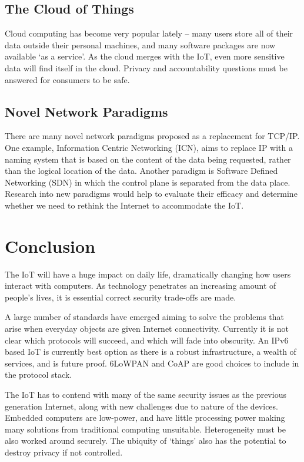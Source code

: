 \documentclass[10pt,journal,compsoc]{IEEEtran}
\begin{document}
\subsection{The Cloud of Things}
Cloud computing has become very popular lately -- many users store all of their
data outside their personal machines, and many software packages are now
available `as a service'. As the cloud merges with the IoT, even more sensitive
data will find itself in the cloud. Privacy and accountability questions must
be answered for consumers to be safe.

\subsection{Novel Network Paradigms}
There are many novel network paradigms proposed as a replacement for TCP/IP. One
example, Information Centric Networking (ICN), aims to replace IP with a naming
system that is based on the content of the data being requested, rather than
the logical location of the data. Another paradigm is Software Defined
Networking (SDN) in which the control plane is separated from the data place.
Research into new paradigms would help to evaluate their efficacy and determine
whether we need to rethink the Internet to accommodate the IoT. 


\section{Conclusion}
The IoT will have a huge impact on daily life, dramatically changing how
users interact with computers. As technology penetrates an increasing amount of
people's lives, it is essential correct security trade-offs are made. 

A large number of standards have emerged aiming to solve the problems that
arise when everyday objects are given Internet connectivity. Currently it is
not clear which protocols will succeed, and which will fade into obscurity. An
IPv6 based IoT is currently best option as there is a robust infrastructure, a
wealth of services, and is future proof. 6LoWPAN and CoAP are good choices to
include in the protocol stack.  

The IoT has to contend with many of the same security issues as the previous
generation Internet, along with new challenges due to nature of the devices.
Embedded computers are low-power, and have little processing power making many
solutions from traditional computing unsuitable. Heterogeneity must be also
worked around securely. The ubiquity of `things' also has the potential to
destroy privacy if not controlled.
\end{document}
